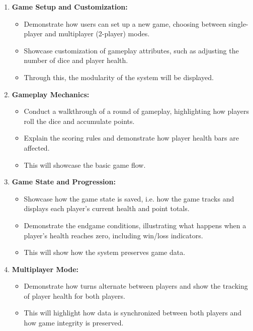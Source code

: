 \documentclass{article}
\begin{document}
\begin{enumerate}
    \item \textbf{Game Setup and Customization:}
    \begin{itemize}
        \item Demonstrate how users can set up a new game, choosing between single-player and multiplayer (2-player) modes.
        \item Showcase customization of gameplay attributes, such as adjusting the number of dice and player health.
        \item Through this, the modularity of the system will be displayed.
    \end{itemize}
    
    \item \textbf{Gameplay Mechanics:}
    \begin{itemize}
        \item Conduct a walkthrough of a round of gameplay, highlighting how players roll the dice and accumulate points.
        \item Explain the scoring rules and demonstrate how player health bars are affected.
        \item This will showcase the basic game flow.
    \end{itemize}
    
    \item \textbf{Game State and Progression:}
    \begin{itemize}
        \item Showcase how the game state is saved, i.e. how the game tracks and displays each player's current health and point totals.
        \item Demonstrate the endgame conditions, illustrating what happens when a player's health reaches zero, including win/loss indicators.
        \item This will show how the system preserves game data.
    \end{itemize}
    
    \item \textbf{Multiplayer Mode:}
    \begin{itemize}
        \item Demonstrate how turns alternate between players and show the tracking of player health for both players.
        \item This will highlight how data is synchronized between both players and how game integrity is preserved.
    \end{itemize}
    

\end{enumerate}
\end{document}
